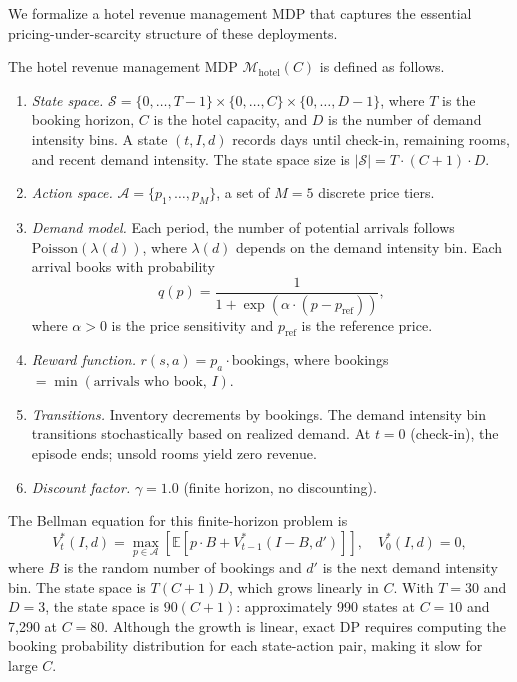 We formalize a hotel revenue management MDP that captures the essential pricing-under-scarcity structure of these deployments.

\begin{definition}
\label{def:hotel_mdp}
The hotel revenue management MDP $\mathcal{M}_{\mathrm{hotel}}(C)$ is defined as follows.
\begin{enumerate}
    \item \emph{State space.} $\mathcal{S} = \{0, \ldots, T-1\} \times \{0, \ldots, C\} \times \{0, \ldots, D-1\}$, where $T$ is the booking horizon, $C$ is the hotel capacity, and $D$ is the number of demand intensity bins. A state $(t, I, d)$ records days until check-in, remaining rooms, and recent demand intensity. The state space size is $|\mathcal{S}| = T \cdot (C + 1) \cdot D$.
    \item \emph{Action space.} $\mathcal{A} = \{p_1, \ldots, p_M\}$, a set of $M = 5$ discrete price tiers.
    \item \emph{Demand model.} Each period, the number of potential arrivals follows $\mathrm{Poisson}(\lambda(d))$, where $\lambda(d)$ depends on the demand intensity bin. Each arrival books with probability
    \begin{equation}
    \label{eq:hotel_booking_prob}
    q(p) = \frac{1}{1 + \exp(\alpha \cdot (p - p_{\mathrm{ref}}))},
    \end{equation}
    where $\alpha > 0$ is the price sensitivity and $p_{\mathrm{ref}}$ is the reference price.
    \item \emph{Reward function.} $r(s, a) = p_a \cdot \text{bookings}$, where bookings $= \min(\text{arrivals who book},\, I)$.
    \item \emph{Transitions.} Inventory decrements by bookings. The demand intensity bin transitions stochastically based on realized demand. At $t = 0$ (check-in), the episode ends; unsold rooms yield zero revenue.
    \item \emph{Discount factor.} $\gamma = 1.0$ (finite horizon, no discounting).
\end{enumerate}
\end{definition}

The Bellman equation for this finite-horizon problem is
\begin{equation}
\label{eq:hotel_bellman}
V^*_t(I, d) = \max_{p \in \mathcal{A}} \left[ \mathbb{E}\left[ p \cdot B + V^*_{t-1}(I - B, d') \right] \right], \quad V^*_0(I, d) = 0,
\end{equation}
where $B$ is the random number of bookings and $d'$ is the next demand intensity bin. The state space is $T(C+1)D$, which grows linearly in $C$. With $T = 30$ and $D = 3$, the state space is $90(C + 1)$: approximately 990 states at $C = 10$ and 7,290 at $C = 80$. Although the growth is linear, exact DP requires computing the booking probability distribution for each state-action pair, making it slow for large $C$.

